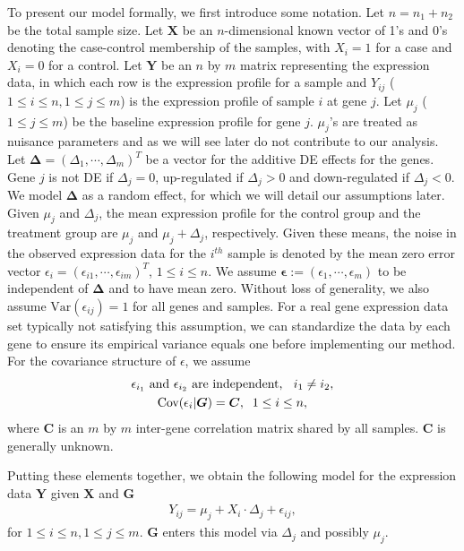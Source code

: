 \documentclass[useAMS,usenatbib, galley]{biom}
\begin{document}
	To present our model formally, we first introduce some notation. Let $n=n_1+n_2$ be the total sample size. Let $\bm X$ be an $n$-dimensional known vector of 1's and 0's denoting the case-control membership of the samples, with $X_i=1$ for a case and $X_i=0$ for a control. Let $\bm Y$ be an $n$ by $m$ matrix representing the expression data, in which each row is the expression profile for a sample and $Y_{ij}$ ($1\le i\le n, 1\le j\le m$) is the expression profile of sample $i$ at gene $j$. Let $\mu_j$ ($1\le j\le m$) be the baseline expression profile for gene $j$. $\mu_j$'s are treated as nuisance parameters and as we will see later do not contribute to our analysis. Let $\bm \Delta=(\Delta_1, \cdots, \Delta_m)^T$ be a vector for the additive DE effects for the genes. Gene $j$ is not DE if $\Delta_j=0$, up-regulated if $\Delta_j >0 $ and down-regulated if $\Delta_j<0$. We model $\bm \Delta$ as a random effect, for which we will detail our assumptions later. Given $\mu_j$ and $\Delta_j$, the mean expression profile for the control group and the treatment group are $\mu_j$ and $\mu_j+\Delta_j$, respectively. Given these means, the noise in the observed expression data for the $i^{th}$ sample is denoted by the mean zero error vector $\epsilon_i=(\epsilon_{i1},\cdots,\epsilon_{im})^T$, $1\le i\le n$. We assume $\bm\epsilon:=(\epsilon_1,\cdots,\epsilon_m)$ to be independent of $\bm \Delta$ and to have mean zero. Without loss of generality, we also assume $\mbox{Var}(\epsilon_{ij})=1$ for all genes and samples. For a real gene expression data set typically not satisfying this assumption, we can standardize the data by each gene to ensure its empirical variance equals one before implementing our method. For the covariance structure of $\epsilon$, we assume 
	\begin{gather}
		\text{$\epsilon_{i_1}$ and $\epsilon_{i_2}$ are independent, \;\;$i_1\ne i_2$},\label{eq:gene_indep}\\
		\mbox{Cov}(\epsilon_i|\bm G)=\bm C, \;\;1\le i\le n,\label{eq:gene_cor}
	\end{gather}
	where $\bm C$ is an $m$ by $m$ inter-gene correlation matrix shared by all samples. $\bm C$ is generally unknown.
	
	Putting these elements together, we obtain the following model for the expression data $\bm Y$ given $\bm X$ and $\bm G$ 
	\begin{align}
		\label{eq:Ymodel}
		Y_{ij} = \mu_j + X_i\cdot\Delta_j + \epsilon_{ij},
	\end{align}
	for $1\le i\le n, 1\le j\le m$. $\bm G$ enters this model via $\Delta_j$ and possibly $\mu_j$.
	
\end{document}
